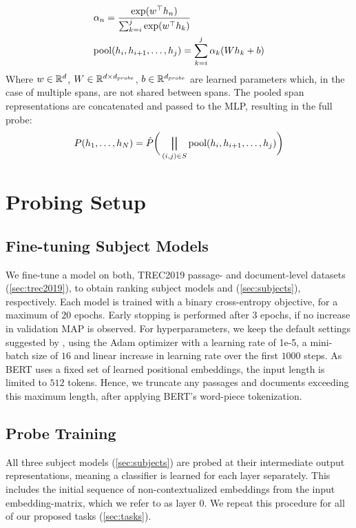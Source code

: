 \begin{equation}
    \begin{aligned}
         & \alpha_n = \frac{\exp(w^\top h_n)}{\sum_{k=i}^j{\exp(w^\top h_k)}}   \\
         & \text{pool}(h_i, h_{i+1},\dots, h_j)= \sum_{k=i}^j\alpha_k (W h_k + b)
    \end{aligned}
\end{equation}
Where $w \in \mathbb{R}^{d}$, $W \in \mathbb{R}^{d \times d_{probe}}$, $b \in \mathbb{R}^{d_{probe}}$ are learned parameters which, in the case of multiple spans, are not shared between spans. The pooled span representations are concatenated and passed to the MLP, resulting in the full probe:
\begin{equation}
    P(h_1,\dots, h_N) = \hat{P}\bigg(\bigparallel_{(i, j) \in S}{\text{pool}(h_i, h_{i+1},\dots, h_j)}\bigg)
\end{equation}

\section{Probing Setup}
\label{sec:probing_setup}
\subsection{Fine-tuning Subject Models}
We fine-tune a  model on both, TREC2019 passage- and document-level datasets (\autoref{sec:trec2019}), to obtain ranking subject models  and  (\autoref{sec:subjects}), respectively. Each model is trained with a binary cross-entropy objective, for a maximum of $20$ epochs. Early stopping is performed after $3$ epochs, if no increase in validation MAP is observed. For hyperparameters, we keep the default settings suggested by \cite{devlin-etal-2019-bert}, using the Adam optimizer\cite{kingma2014adam} with a learning rate of 1e-5, a mini-batch size of $16$ and linear increase in learning rate over the first $1000$ steps. As BERT uses a fixed set of learned positional embeddings, the input length is limited to $512$ tokens. Hence, we truncate any passages and documents exceeding this maximum length, after applying BERT's word-piece tokenization.

\subsection{Probe Training}
All three subject models (\autoref{sec:subjects}) are probed at their intermediate output representations, meaning a classifier is learned for each layer separately. This includes the initial sequence of non-contextualized embeddings from the input embedding-matrix, which we refer to as layer $0$. We repeat this procedure for all of our proposed tasks (\autoref{sec:tasks}).

